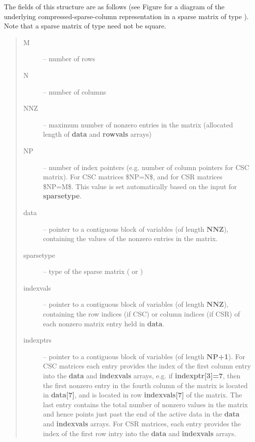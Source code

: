 \documentclass[letterpaper,10pt,english]{sphinxmanual}
\begin{document}
The fields of this structure are as follows (see Figure
{\hyperref[linear_solvers/SLS:sls-figure]{\emph{}}}
for a diagram of the underlying compressed-sparse-column
representation in a sparse matrix of type {\hyperref[linear_solvers/SLS:c.SlsMat]{\emph{}}}).  Note that a
sparse matrix of type {\hyperref[linear_solvers/SLS:c.SlsMat]{\emph{}}} need not be square.
\begin{quote}\begin{description}
\item[{M}] \leavevmode
-- number of rows

\item[{N}] \leavevmode
--  number of columns

\item[{NNZ}] \leavevmode
-- maximum number of nonzero entries in the matrix (allocated
length of \textbf{data} and \textbf{rowvals} arrays)

\item[{NP}] \leavevmode
-- number of index pointers (e.g. number of column pointers for
CSC matrix). For CSC matrices \$NP=N\$, and for CSR matrices \$NP=M\$. This
value is set automatically based on the input for \textbf{sparsetype}.

\item[{data}] \leavevmode
-- pointer to a contiguous block of  variables (of
length \textbf{NNZ}), containing the values of the nonzero entries in the
matrix.

\item[{sparsetype}] \leavevmode
-- type of the sparse matrix ( or )

\item[{indexvals}] \leavevmode
-- pointer to a contiguous block of  variables (of
length \textbf{NNZ}), containing the row indices (if CSC) or column
indices (if CSR) of each nonzero matrix entry held in \textbf{data}.

\item[{indexptrs}] \leavevmode
-- pointer to a contiguous block of  variables (of
length \textbf{NP+1}).  For CSC matrices each entry provides the index of
the first column entry into the \textbf{data} and \textbf{indexvals} arrays,
e.g. if \textbf{indexptr{[}3{]}=7}, then the first nonzero entry in the
fourth column of the matrix is located in \textbf{data{[}7{]}}, and is
located in row \textbf{indexvals{[}7{]}} of the matrix.  The last entry
contains the total number of nonzero values in the matrix and hence
points just past the end of the active data in the \textbf{data} and
\textbf{indexvals} arrays.  For CSR matrices, each entry provides the
index of the first row intry into the \textbf{data} and \textbf{indexvals}
arrays.

\end{description}\end{quote}
\end{document}
